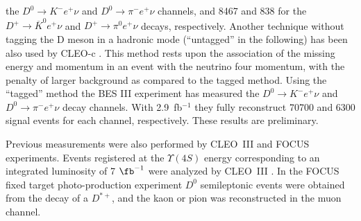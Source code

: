 the $D^0 \to K^{-} e^+\nu$ and $D^0\to \pi^{-} e^+\nu$ channels, and 8467 and 838 for the 
$D^+\to {\overline K}^{0} e^+\nu$ and $D^+\to \pi^{0} e^+\nu$ decays, respectively. 
Another technique without tagging the D meson in a hadronic mode (``untagged'' in the following) has been also 
used by CLEO-c \cite{Dobbs:2007aa}. This method rests upon the association of the missing energy and momentum in 
an event with the neutrino four momentum, with the penalty of larger background as compared to the tagged method. 
Using the ``tagged'' method the BES III experiment has measured the $D^0 \to {K}^- e^+ \nu$ and 
$D^0 \to {\pi}^- e^+ \nu$ decay channels. With 2.9~fb$^{-1}$ they fully reconstruct 70700 and 6300 signal 
events for each channel, respectively. These results are preliminary. 

  Previous measurements were also performed by CLEO~III and FOCUS experiments. 
Events registered at the $\Upsilon (4S)$ energy corresponding to an integrated luminosity of 7 $\fb^{-1}$ were 
analyzed by CLEO~III \cite{Huang:2004fra}. 
In the FOCUS fixed target photo-production experiment $D^0$ semileptonic events were obtained from the decay of 
a $D^{\ast +}$, and the kaon or pion was reconstructed in the muon channel. 

